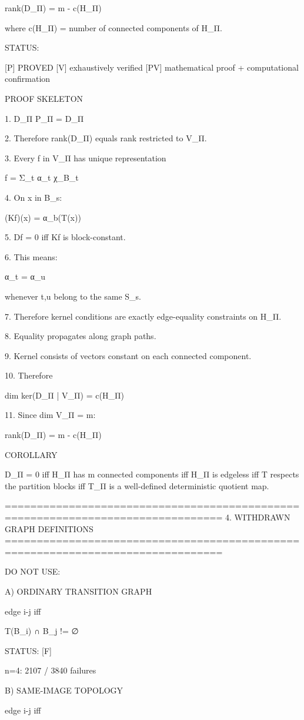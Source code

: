 rank(D_Π) = m - c(H_Π)

where c(H_Π) = number of connected components of H_Π.

STATUS:

[P] PROVED
[V] exhaustively verified
[PV] mathematical proof + computational confirmation

PROOF SKELETON

1. D_Π P_Π = D_Π

2. Therefore rank(D_Π) equals rank restricted to V_Π.

3. Every f in V_Π has unique representation

       f = Σ_t α_t χ_{B_t}

4. On x in B_s:

       (Kf)(x) = α_{b(T(x))}

5. Df = 0 iff Kf is block-constant.

6. This means:

       α_t = α_u

   whenever t,u belong to the same S_s.

7. Therefore kernel conditions are exactly edge-equality
   constraints on H_Π.

8. Equality propagates along graph paths.

9. Kernel consists of vectors constant on each connected component.

10. Therefore

       dim ker(D_Π | V_Π) = c(H_Π)

11. Since dim V_Π = m:

       rank(D_Π) = m - c(H_Π)

COROLLARY

D_Π = 0
iff
H_Π has m connected components
iff
H_Π is edgeless
iff
T respects the partition blocks
iff
T_Π is a well-defined deterministic quotient map.

================================================================================
4. WITHDRAWN GRAPH DEFINITIONS
================================================================================

DO NOT USE:

A) ORDINARY TRANSITION GRAPH

edge i-j iff

T(B_i) ∩ B_j != ∅

STATUS: [F]

n=4:
2107 / 3840 failures

B) SAME-IMAGE TOPOLOGY

edge i-j iff

